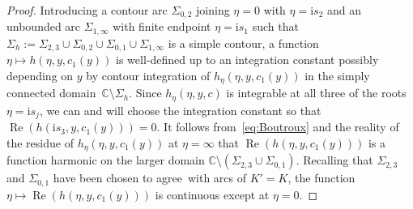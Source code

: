 \begin{proof}
Introducing a contour arc $\Sigma_{0,2}$ joining $\eta=0$ with $\eta=\mathrm{i} s_2$ and an unbounded arc $\Sigma_{1,\infty}$ with finite endpoint $\eta=\mathrm{i} s_1$ such that $\Sigma_h:=\Sigma_{2,3}\cup\Sigma_{0,2}\cup\Sigma_{0,1}\cup\Sigma_{1,\infty}$ is a simple contour, a function $\eta\mapsto h(\eta,y,c_1(y))$ is well-defined up to an integration constant possibly depending on $y$ by contour integration of $h_\eta(\eta,y,c_1(y))$ in the simply connected domain~${\mathbb{C}\setminus\Sigma_h}$. Since $h_\eta(\eta,y,c)$ is integrable at all three of the roots $\eta=\mathrm{i} s_j$, we can and will choose the integration constant so that $\operatorname{Re}(h(\mathrm{i} s_3,y,c_1(y)))=0$. It follows from~\eqref{eq:Boutroux} and the reality of the residue of $h_\eta(\eta,y,c_1(y))$ at $\eta=\infty$ that $\operatorname{Re}(h(\eta,y,c_1(y)))$ is a function harmonic on the larger domain $\mathbb{C}\setminus(\Sigma_{2,3}\cup\Sigma_{0,1})$. Recalling that $\Sigma_{2,3}$ and $\Sigma_{0,1}$ have been chosen to agree~with arcs of $K'=K$, the function $\eta\mapsto\operatorname{Re}(h(\eta,y,c_1(y)))$ is continuous except at ${\eta=0}$.
\end{proof}
